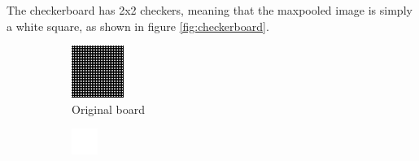 \documentclass[]{article}
\begin{document}
The checkerboard has 2x2 checkers, meaning that the maxpooled image is simply a white square, as shown in figure \ref{fig:checkerboard}.
\begin{figure}[H]
     \centering
     \begin{subfigure}[b]{0.6\textwidth}
         \centering
         \includegraphics[width=\textwidth]{checkerboard}
         \caption{Original board}
         \label{fig:checkerboard_before}
     \end{subfigure}
     \hfill
     \begin{subfigure}[b]{0.3\textwidth}
         \centering
         \includegraphics[width=\textwidth]{checkerboard_maxpooled}

\end{subfigure}
\end{figure}
\end{document}
